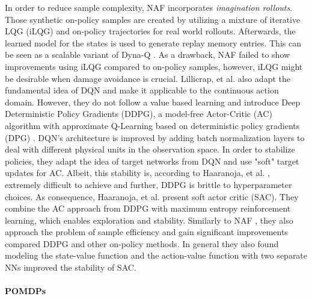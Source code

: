 		In order to reduce sample complexity, NAF incorporates \textit{imagination rollouts}. 
		Those synthetic on-policy samples are created by utilizing a mixture of iterative LQG (iLQG) \cite{Todorov2005} and on-policy trajectories for real world rollouts.
		Afterwards, the learned model for the states is used to generate replay memory entries. 
		This can be seen as a scalable variant of Dyna-Q \cite{Sutton1990}. 
		As a drawback, NAF failed to show improvements using iLQG compared to on-policy samples, however, iLQG might be desirable when damage avoidance is crucial. 
		Lillicrap, et al. \cite{Lillicrap2016} also adapt the fundamental idea of DQN \cite{Mnih2015} and make it applicable to the continuous action domain. 
		However, they do not follow a value based learning and introduce Deep Deterministic Policy Gradients (DDPG), a model-free Actor-Critic (AC) algorithm with approximate Q-Learning based on deterministic policy gradients (DPG) \cite{Silver2014}.
		DQN's \cite{Mnih2015} architecture is improved by adding batch normalization layers \cite{Ioffe2015} to deal with different physical units in the observation space. 
		In order to stabilize policies, they adapt the idea of target networks from DQN \cite{Mnih2015} and use "soft" target updates for AC. 
		Albeit, this stability is, according to Haaranoja, et al. \cite{Haarnoja2018}, extremely difficult to achieve and further, DDPG is brittle to hyperparameter choices. 
		As consequence, Haaranoja, et al. \cite{Haarnoja2018} present soft actor critic (SAC).
		They combine the AC approach from DDPG \cite{Lillicrap2016} with maximum entropy reinforcement learning, which enables exploration and stability. 
		Similarly to NAF \cite{Gu2016}, they also approach the problem of sample efficiency and gain significant improvements compared DDPG and other on-policy methods.
		In general they also found modeling the state-value function and the action-value function with two separate NNs improved the stability of SAC. 
		
		
		
 	\paragraph{POMDPs}
